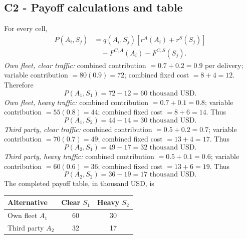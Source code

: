 {	\vspace{-3mm}
	
	\label{subsec:urban-delivery-service-c1-c2-c2-payoff-table}
	\subsection*{C2 - Payoff calculations and table}
	
	For every cell,
	\[
	\begin{aligned}
	P(A_i,S_j)&=q(A_i,S_j)[r^A(A_i)+r^S(S_j)]\\
	&\quad-F^{C,A}(A_i)-F^{C,S}(S_j).
	\end{aligned}
	\]
	\textit{Own fleet, clear traffic:} combined contribution \(=0.7+0.2=0.9\) per delivery; variable contribution \(=80(0.9)=72\); combined fixed cost \(=8+4=12\). Therefore
	\[
	P(A_1,S_1)=72-12=60\text{ thousand USD}.
	\]
	\textit{Own fleet, heavy traffic:} combined contribution \(=0.7+0.1=0.8\); variable contribution \(=55(0.8)=44\); combined fixed cost \(=8+6=14\). Thus
	\[
	P(A_1,S_2)=44-14=30\text{ thousand USD}.
	\]
	\textit{Third party, clear traffic:} combined contribution \(=0.5+0.2=0.7\); variable contribution \(=70(0.7)=49\); combined fixed cost \(=13+4=17\). Thus
	\[
	P(A_2,S_1)=49-17=32\text{ thousand USD}.
	\]
	\textit{Third party, heavy traffic:} combined contribution \(=0.5+0.1=0.6\); variable contribution \(=60(0.6)=36\); combined fixed cost \(=13+6=19\). Thus
	\[
	P(A_2,S_2)=36-19=17\text{ thousand USD}.
	\]
	The completed payoff table, in thousand USD, is
	\begin{center}
	\begin{tabular}{lcc}
	\toprule
	Alternative & Clear \(S_1\) & Heavy \(S_2\)\\
	\midrule
	Own fleet \(A_1\)&60&30\\
	Third party \(A_2\)&32&17\\
	\bottomrule
	\end{tabular}
	\end{center}


	\vspace{-8mm}

	}

